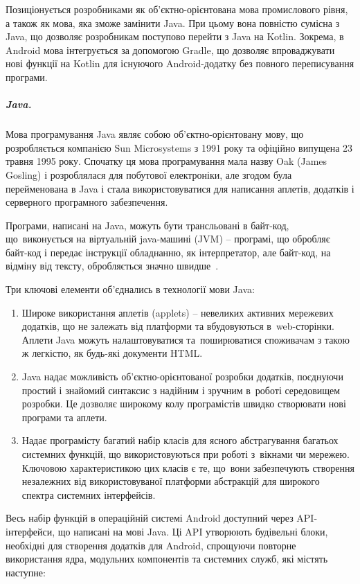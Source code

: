 \documentclass[../main.tex]{subfiles}
\begin{document}
Позиціонується розробниками як об'єктно-орієнтована мова промислового рівня, а також як мова, яка зможе замінити Java. При цьому вона повністю сумісна з Java, що дозволяє розробникам поступово перейти з Java на Kotlin. Зокрема, в Android мова інтегрується за допомогою Gradle, що дозволяє впроваджувати нові функції на Kotlin для існуючого Android-додатку без повного переписування програми.

\subparagraph{Java.}
Мова програмування Java являє собою об'єктно-орієнтовану мову, що розробляється компанією Sun Microsystems з 1991 року та офіційно випущена 23 травня 1995 року. Спочатку ця мова програмування  мала назву Oak (James Gosling) і розроблялася для побутової електроніки, але згодом була перейменована в Java і стала використовуватися для написання аплетів, додатків і серверного програмного забезпечення.

Програми, написані на Java, можуть бути трансльовані в байт-код, що~виконується на віртуальній java-машині (JVM) -- програмі, що обробляє байт-код і передає інструкції обладнанню, як інтерпретатор, але байт-код, на відміну від тексту, обробляється значно швидше~\cite{learn_java}.

Три ключові елементи об'єднались в технології мови Java:
\begin{enumerate}
	\item Широке використання аплетів (applets) -- невеликих активних мережевих додатків, що не залежать від платформи та вбудовуються в~web-сторінки. Аплети Java можуть налаштовуватися та~поширюватися споживачам з такою ж легкістю, як будь-які документи HTML.
	\item Java надає можливість об'єктно-орієнтованої розробки додатків, поєднуючи простий і знайомий синтаксис з надійним і зручним в~роботі середовищем розробки. Це дозволяє широкому колу програмістів швидко створювати нові програми та аплети.
	\item Надає програмісту багатий набір класів для ясного абстрагування багатьох системних функцій, що використовуються при роботі з~вікнами чи мережею. Ключовою характеристикою цих класів є те, що~вони забезпечують створення незалежних від використовуваної платформи абстракцій для широкого спектра системних інтерфейсів.
\end{enumerate}

Весь набір функцій в операційній системі Android доступний через API-інтерфейси, що написані на мові Java. Ці API утворюють будівельні блоки, необхідні для створення додатків для Android, спрощуючи повторне використання ядра, модульних компонентів та системних служб, які містять наступне:
\end{document}
